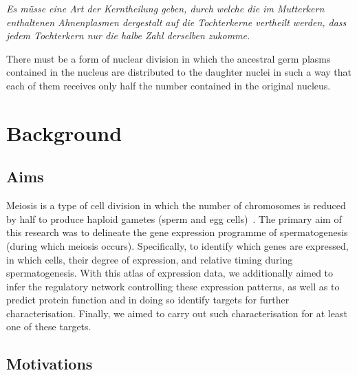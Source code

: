 \begin{savequote}[8cm]
\textit{Es müsse eine Art der Kerntheilung geben, durch welche die im Mutterkern enthaltenen Ahnenplasmen dergestalt auf die Tochterkerne vertheilt werden, dass jedem Tochterkern nur die halbe Zahl derselben zukomme.}

There must be a form of nuclear division in which the ancestral germ plasms contained in the nucleus are distributed to the daughter nuclei in such a way that each of them receives only half the number contained in the original nucleus.
\end{savequote}

\chapter{\label{ch:1-intro}Background}

\minitoc


\section{Aims}
Meiosis is a type of cell division in which the number of chromosomes is reduced by half to produce haploid gametes (sperm and egg cells)~\parencite{Ohkura2015Meiosis}.
The primary aim of this research was to delineate the gene expression programme of spermatogenesis (during which meiosis occurs).
Specifically, to identify which genes are expressed, in which cells, their degree of expression, and relative timing during spermatogenesis.
With this atlas of expression data, we additionally aimed to infer the regulatory network controlling these expression patterns, as well as to predict protein function and in doing so identify targets for further characterisation.
Finally, we aimed to carry out such characterisation for at least one of these targets.


\section{Motivations}

